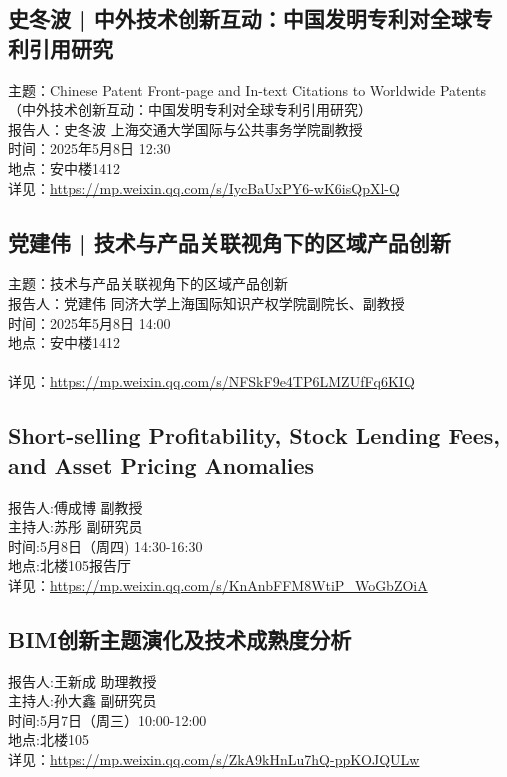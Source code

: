 \documentclass[letterpaper, 12pt]{article}
\begin{document}
\begin{multicols}{2}
\subsection{史冬波 | 中外技术创新互动：中国发明专利对全球专利引用研究} %
主题：Chinese Patent Front-page and In-text Citations to Worldwide Patents（中外技术创新互动：中国发明专利对全球专利引用研究）
\\报告人：史冬波 上海交通大学国际与公共事务学院副教授
\\时间：2025年5月8日 12:30
\\地点：安中楼1412 
\\详见：\url{https://mp.weixin.qq.com/s/IycBaUxPY6-wK6isQpXl-Q}

\subsection{党建伟 | 技术与产品关联视角下的区域产品创新} %
主题：技术与产品关联视角下的区域产品创新
\\报告人：党建伟 同济大学上海国际知识产权学院副院长、副教授
\\时间：2025年5月8日 14:00
\\地点：安中楼1412 
\\
\\详见：\url{https://mp.weixin.qq.com/s/NFSkF9e4TP6LMZUfFq6KIQ}

\subsection{Short-selling Profitability, Stock Lending Fees, and Asset Pricing Anomalies} %
报告人:傅成博 副教授
\\主持人:苏彤 副研究员
\\时间:5月8日（周四) 14:30-16:30
\\地点:北楼105报告厅
\\详见：\url{https://mp.weixin.qq.com/s/KnAnbFFM8WtiP_WoGbZOiA}

\subsection{BIM创新主题演化及技术成熟度分析} %
报告人:王新成 助理教授
\\主持人:孙大鑫 副研究员
\\时间:5月7日（周三）10:00-12:00
\\地点:北楼105
\\详见：\url{https://mp.weixin.qq.com/s/ZkA9kHnLu7hQ-ppKOJQULw}


\end{multicols}
\end{document}
